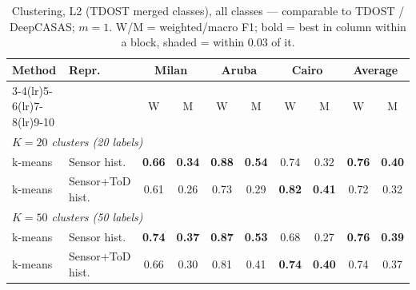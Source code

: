 \begin{table}[H]
\centering\small
\caption{Clustering, L2 (TDOST merged classes), all classes --- comparable to TDOST / DeepCASAS; $m=1$. W/M = weighted/macro F1; bold = best in column within a block, shaded = within 0.03 of it.}
\label{tab:clu_l2_all_m1}
\setlength{\tabcolsep}{3.5pt}
\begin{tabular}{llcc|cc|cc|cc}
\toprule
Method & Repr. & \multicolumn{2}{c}{Milan} & \multicolumn{2}{c}{Aruba} & \multicolumn{2}{c}{Cairo} & \multicolumn{2}{c}{Average} \\
\cmidrule(lr){3-4}\cmidrule(lr){5-6}\cmidrule(lr){7-8}\cmidrule(lr){9-10}
 & & W & M & W & M & W & M & W & M \\
\midrule
\multicolumn{10}{l}{\textit{$K = 20$ clusters (20 labels)}} \\
\midrule
k-means & Sensor hist. & \cellcolor{blue!12}\textbf{0.66} & \cellcolor{blue!12}\textbf{0.34} & \cellcolor{blue!12}\textbf{0.88} & \cellcolor{blue!12}\textbf{0.54} & 0.74 & 0.32 & \cellcolor{blue!12}\textbf{0.76} & \cellcolor{blue!12}\textbf{0.40} \\
k-means & Sensor+ToD hist. & 0.61 & 0.26 & 0.73 & 0.29 & \cellcolor{blue!12}\textbf{0.82} & \cellcolor{blue!12}\textbf{0.41} & 0.72 & 0.32 \\
\midrule
\multicolumn{10}{l}{\textit{$K = 50$ clusters (50 labels)}} \\
\midrule
k-means & Sensor hist. & \cellcolor{blue!12}\textbf{0.74} & \cellcolor{blue!12}\textbf{0.37} & \cellcolor{blue!12}\textbf{0.87} & \cellcolor{blue!12}\textbf{0.53} & 0.68 & 0.27 & \cellcolor{blue!12}\textbf{0.76} & \cellcolor{blue!12}\textbf{0.39} \\
k-means & Sensor+ToD hist. & 0.66 & 0.30 & 0.81 & 0.41 & \cellcolor{blue!12}\textbf{0.74} & \cellcolor{blue!12}\textbf{0.40} & \cellcolor{blue!12}0.74 & \cellcolor{blue!12}0.37 \\
\bottomrule
\end{tabular}
\end{table}
